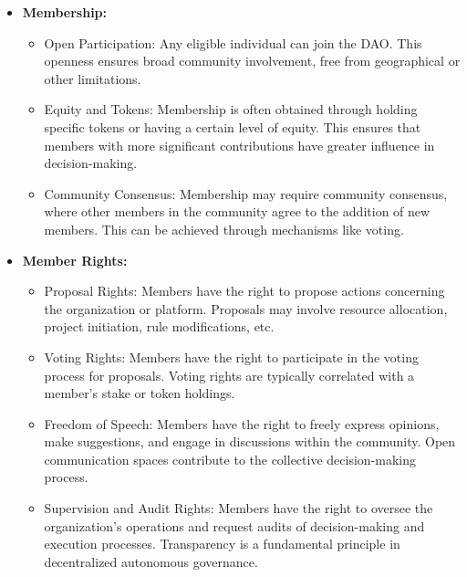\documentclass[lettersize,journal]{IEEEtran}
\begin{document}
\begin{itemize}
  \item \textbf{Membership:}
  \begin{itemize}
    \item Open Participation: Any eligible individual can join the DAO. This openness ensures broad community involvement, free from geographical or other limitations.
    \item Equity and Tokens: Membership is often obtained through holding specific tokens or having a certain level of equity. This ensures that members with more significant contributions have greater influence in decision-making.
    \item Community Consensus: Membership may require community consensus, where other members in the community agree to the addition of new members. This can be achieved through mechanisms like voting.
  \end{itemize}
  \item \textbf{Member Rights:}
  \begin{itemize}
    \item Proposal Rights: Members have the right to propose actions concerning the organization or platform. Proposals may involve resource allocation, project initiation, rule modifications, etc.
    \item Voting Rights: Members have the right to participate in the voting process for proposals. Voting rights are typically correlated with a member's stake or token holdings.
    \item Freedom of Speech: Members have the right to freely express opinions, make suggestions, and engage in discussions within the community. Open communication spaces contribute to the collective decision-making process.
    \item Supervision and Audit Rights: Members have the right to oversee the organization's operations and request audits of decision-making and execution processes. Transparency is a fundamental principle in decentralized autonomous governance.

\end{itemize}
\end{itemize}
\end{document}

